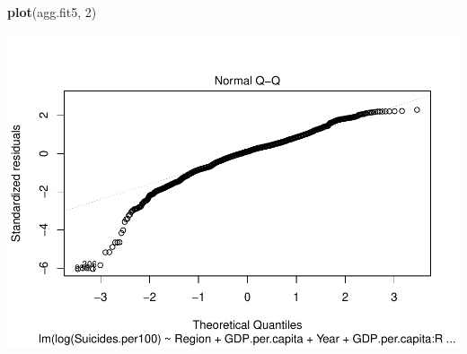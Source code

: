 \documentclass[11pt,]{article}
\newenvironment{Shaded}{\begin{snugshade}}{\end{snugshade}}
\newcommand{\DecValTok}[1]{\textcolor[rgb]{0.00,0.00,0.81}{#1}}
\newcommand{\KeywordTok}[1]{\textcolor[rgb]{0.13,0.29,0.53}{\textbf{#1}}}
\newcommand{\NormalTok}[1]{#1}
\begin{document}
\begin{Shaded}
\begin{Highlighting}[]
\KeywordTok{plot}\NormalTok{(agg.fit5, }\DecValTok{2}\NormalTok{)}
\end{Highlighting}
\end{Shaded}

\includegraphics{An-Analysis-of-Suicide-Data_files/figure-latex/unnamed-chunk-9-2.pdf}
\end{document}
